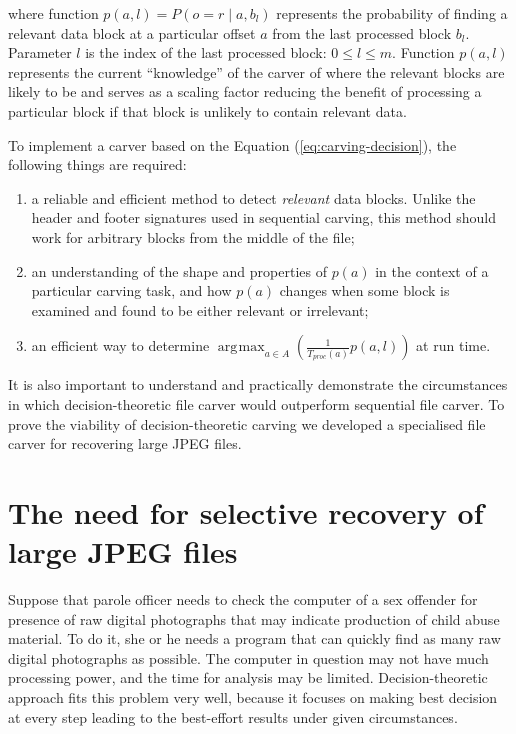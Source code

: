 \documentclass[final,5p,times,twocolumn,authoryear]{elsarticle}
\DeclareMathOperator*{\argmax}{\arg\!\max}
\begin{document}
where function $p(a,l) = P(o=r \mid a,b_l)$ represents the probability of finding a relevant data block at a particular offset $a$ from the last processed block $b_l$. Parameter $l$ is the index of the last processed block: $0 \leq l \leq m$. Function $p(a,l)$ represents the current ``knowledge'' of the carver of where the relevant blocks are likely to be and serves as a scaling factor reducing the benefit of processing a particular block if that block is unlikely to contain relevant data.

To implement a carver based on the Equation (\ref{eq:carving-decision}), the following things are required:

\begin{enumerate}
\item{a reliable and efficient method to detect \emph{relevant} data blocks. Unlike the header and footer signatures used in sequential carving, this method should work for arbitrary blocks from the middle of the file;}
\item{an understanding of the shape and properties of $p(a)$ in the context of a particular carving task, and how $p(a)$ changes when some block is examined and found to be either relevant or irrelevant;}
\item{an efficient way to determine $\argmax_{a \in A} \left( \frac{1}{T_{proc}(a)} p(a,l)\right)$ at run time.}

\end{enumerate}

It is also important to understand and practically demonstrate the circumstances in which decision-theoretic file carver would outperform sequential file carver. To prove the viability of decision-theoretic carving we developed a specialised file carver for recovering large JPEG files. 

\section{The need for selective recovery of large JPEG files}

Suppose that parole officer needs to check the computer of a sex offender for presence of raw digital photographs that may indicate production of child abuse material. To do it, she or he needs a program that can quickly find as many raw digital photographs as possible. The computer in question may not have much processing power, and the time for analysis may be limited. Decision-theoretic approach fits this problem very well, because it focuses on making best decision at every step leading to the best-effort results under given circumstances.  
\end{document}
